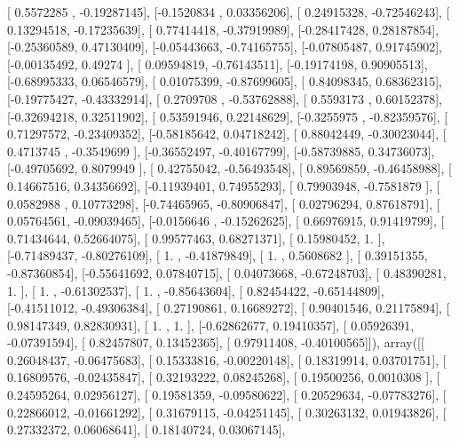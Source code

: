 \documentclass{article}
\begin{document}
       [ 0.5572285 , -0.19287145],
       [-0.1520834 ,  0.03356206],
       [ 0.24915328, -0.72546243],
       [ 0.13294518, -0.17235639],
       [ 0.77414418, -0.37919989],
       [-0.28417428,  0.28187854],
       [-0.25360589,  0.47130409],
       [-0.05443663, -0.74165755],
       [-0.07805487,  0.91745902],
       [-0.00135492,  0.49274   ],
       [ 0.09594819, -0.76143511],
       [-0.19174198,  0.90905513],
       [-0.68995333,  0.06546579],
       [ 0.01075399, -0.87699605],
       [ 0.84098345,  0.68362315],
       [-0.19775427, -0.43332914],
       [ 0.2709708 , -0.53762888],
       [ 0.5593173 ,  0.60152378],
       [-0.32694218,  0.32511902],
       [ 0.53591946,  0.22148629],
       [-0.3255975 , -0.82359576],
       [ 0.71297572, -0.23409352],
       [-0.58185642,  0.04718242],
       [ 0.88042449, -0.30023044],
       [ 0.4713745 , -0.3549699 ],
       [-0.36552497, -0.40167799],
       [-0.58739885,  0.34736073],
       [-0.49705692,  0.8079949 ],
       [ 0.42755042, -0.56493548],
       [ 0.89569859, -0.46458988],
       [ 0.14667516,  0.34356692],
       [-0.11939401,  0.74955293],
       [ 0.79903948, -0.7581879 ],
       [ 0.0582988 ,  0.10773298],
       [-0.74465965, -0.80906847],
       [ 0.02796294,  0.87618791],
       [ 0.05764561, -0.09039465],
       [-0.0156646 , -0.15262625],
       [ 0.66976915,  0.91419799],
       [ 0.71434644,  0.52664075],
       [ 0.99577463,  0.68271371],
       [ 0.15980452,  1.        ],
       [-0.71489437, -0.80276109],
       [ 1.        , -0.41879849],
       [ 1.        ,  0.5608682 ],
       [ 0.39151355, -0.87360854],
       [-0.55641692,  0.07840715],
       [ 0.04073668, -0.67248703],
       [ 0.48390281,  1.        ],
       [ 1.        , -0.61302537],
       [ 1.        , -0.85643604],
       [ 0.82454422, -0.65144809],
       [-0.41511012, -0.49306384],
       [ 0.27190861,  0.16689272],
       [ 0.90401546,  0.21175894],
       [ 0.98147349,  0.82830931],
       [ 1.        ,  1.        ],
       [-0.62862677,  0.19410357],
       [ 0.05926391, -0.07391594],
       [ 0.82457807,  0.13452365],
       [ 0.97911408, -0.40100565]]), array([[ 0.26048437, -0.06475683],
       [ 0.15333816, -0.00220148],
       [ 0.18319914,  0.03701751],
       [ 0.16809576, -0.02435847],
       [ 0.32193222,  0.08245268],
       [ 0.19500256,  0.0010308 ],
       [ 0.24595264,  0.02956127],
       [ 0.19581359, -0.09580622],
       [ 0.20529634, -0.07783276],
       [ 0.22866012, -0.01661292],
       [ 0.31679115, -0.04251145],
       [ 0.30263132,  0.01943826],
       [ 0.27332372,  0.06068641],
       [ 0.18140724,  0.03067145],
\end{document}
